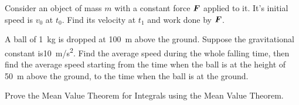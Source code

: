\documentclass[Calculus 1 Recitation.tex]{subfiles}
\begin{document}
\begin{myleftlinebox}
	Consider an object of mass $m$ with a constant force $\boldsymbol{F}$ applied to it. It's initial speed is $v_0$ at $t_0$. Find its velocity at $t_1$ and work done by $\boldsymbol{F}$.
	\tcblower
	\vspace{2em}
\end{myleftlinebox}

\begin{myleftlinebox}
	A ball of \SI{1}{kg} is dropped at \SI{100}{m} above the ground. Suppose the gravitational constant is\SI{10}{m/s^2}. Find the average speed during the whole falling time, then find the average speed starting from the time when the ball is at the height of \SI{50}{m} above the ground, to the time when the ball is at the ground.
	\tcblower
	\vspace{2em}
\end{myleftlinebox}

\begin{myleftlinebox}
	Prove the Mean Value Theorem for Integrals using the Mean Value Theorem.
	\tcblower
	\vspace{2em}
\end{myleftlinebox}
\end{document}
